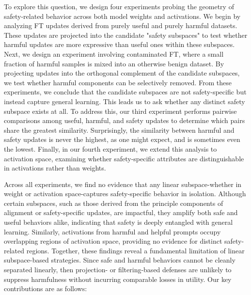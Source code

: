 \documentclass[10pt]{article}
\begin{document}
To explore this question, we design four experiments probing the geometry of safety-related behavior across both model weights and activations. We begin by analyzing FT updates derived from purely useful and purely harmful datasets. These updates are projected into the candidate "safety subspaces" to test whether harmful updates are more expressive than useful ones within these subspaces. Next, we design an experiment involving contaminated FT, where a small fraction of harmful samples is mixed into an otherwise benign dataset. By projecting updates into the orthogonal complement of the candidate subspaces, we test whether harmful components can be selectively removed. From these experiments, we conclude that the candidate subspaces are not safety-specific but instead capture general learning. This leads us to ask whether any distinct safety subspace exists at all. To address this, our third experiment performs pairwise comparisons among useful, harmful, and safety updates to determine which pairs share the greatest similarity. Surprisingly, the similarity between harmful and safety updates is never the highest, as one might expect, and is sometimes even the lowest. Finally, in our fourth experiment, we extend this analysis to activation space, examining whether safety-specific attributes are distinguishable in activations rather than weights.

Across all experiments, we find no evidence that any linear subspace-whether in weight or activation space-captures safety-specific behavior in isolation. Although certain subspaces, such as those derived from the principle components of alignment or safety-specific updates, are impactful, they amplify both safe and useful behaviors alike, indicating that safety is deeply entangled with general learning. Similarly, activations from harmful and helpful prompts occupy overlapping regions of activation space, providing no evidence for distinct safety-related regions. Together, these findings reveal a fundamental limitation of linear subspace-based strategies. Since safe and harmful behaviors cannot be cleanly separated linearly, then projection- or filtering-based defenses are unlikely to suppress harmfulness without incurring comparable losses in utility. Our key contributions are as follows:
\end{document}
